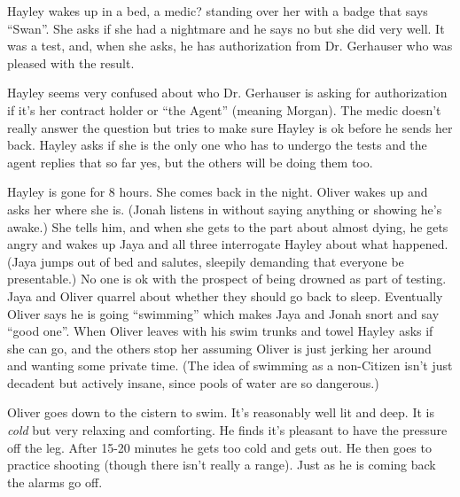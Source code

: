 Hayley wakes up in a bed, a medic? standing over her with a badge that says ``Swan''.  She asks if she had a nightmare and he says no but she did very well.  It was a test, and, when she asks, he has authorization from Dr. Gerhauser who was pleased with the result.



Hayley seems very confused about who Dr. Gerhauser is asking for authorization if it's her contract holder or ``the Agent'' (meaning Morgan).  The medic doesn't really answer the question but tries to make sure Hayley is ok before he sends her back.  Hayley asks if she is the only one who has to undergo the tests and the agent replies that so far yes, but the others will be doing them too.



Hayley is gone for 8 hours.  She comes back in the night.  Oliver wakes up and asks her where she is.  (Jonah listens in without saying anything or showing he's awake.)  She tells him, and when she gets to the part about almost dying, he gets angry and wakes up Jaya and all three interrogate Hayley about what happened.  (Jaya jumps out of bed and salutes, sleepily demanding that everyone be presentable.)  No one is ok with the prospect of being drowned as part of testing.  Jaya and Oliver quarrel about whether they should go back to sleep.  Eventually Oliver says he is going ``swimming'' which makes Jaya and Jonah snort and say ``good one''.  When Oliver leaves with his swim trunks and towel Hayley asks if she can go, and the others stop her assuming Oliver is just jerking her around and wanting some private time.  (The idea of swimming as a non-Citizen isn't just decadent but actively insane, since pools of water are so dangerous.)




Oliver goes down to the cistern to swim.  It's reasonably well lit and deep.  It is \textit{cold} but very relaxing and comforting.  He finds it's pleasant to have the pressure off the leg.   After 15-20 minutes he gets too cold and gets out.  He then goes to practice shooting (though there isn't really a range).  Just as he is coming back the alarms go off.



